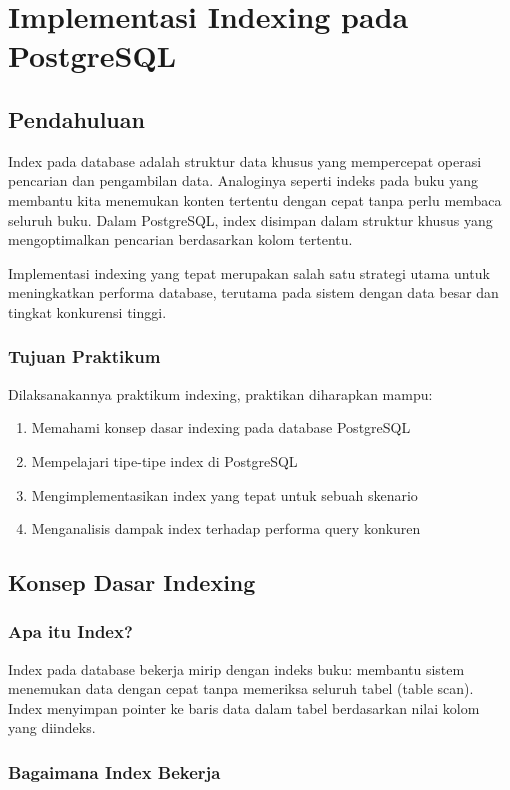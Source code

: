 \chapter{Implementasi Indexing pada PostgreSQL}
\setcounter{section}{0}
\section{Pendahuluan}
Index pada database adalah struktur data khusus yang mempercepat operasi pencarian dan pengambilan data. Analoginya seperti indeks pada buku yang membantu kita menemukan konten tertentu dengan cepat tanpa perlu membaca seluruh buku. Dalam PostgreSQL, index disimpan dalam struktur khusus yang mengoptimalkan pencarian berdasarkan kolom tertentu.

Implementasi indexing yang tepat merupakan salah satu strategi utama untuk meningkatkan performa database, terutama pada sistem dengan data besar dan tingkat konkurensi tinggi.

\subsection{Tujuan Praktikum}
Dilaksanakannya praktikum indexing, praktikan diharapkan mampu:
\begin{enumerate}
    \item Memahami konsep dasar indexing pada database PostgreSQL
    \item Mempelajari tipe-tipe index di PostgreSQL
    \item Mengimplementasikan index yang tepat untuk sebuah skenario
    \item Menganalisis dampak index terhadap performa query konkuren
\end{enumerate}

\section{Konsep Dasar Indexing}

\subsection{Apa itu Index?}
Index pada database bekerja mirip dengan indeks buku: membantu sistem menemukan data dengan cepat tanpa memeriksa seluruh tabel (table scan). Index menyimpan pointer ke baris data dalam tabel berdasarkan nilai kolom yang diindeks.

\subsection{Bagaimana Index Bekerja}

